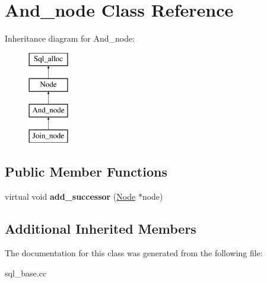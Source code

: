 \hypertarget{classAnd__node}{}\section{And\+\_\+node Class Reference}
\label{classAnd__node}
Inheritance diagram for And\+\_\+node\+:\begin{figure}[H]
\begin{center}
\leavevmode
\includegraphics[height=4.000000cm]{classAnd__node}
\end{center}
\end{figure}
\subsection*{Public Member Functions}
\begin{DoxyCompactItemize}
\item 
\mbox{\label{classAnd__node_ad5e9b18061d8e23a3931a6c2a4db316c}} 
virtual void {\bfseries add\+\_\+successor} (\mbox{\hyperlink{classNode}{Node}} $\ast$node)
\end{DoxyCompactItemize}
\subsection*{Additional Inherited Members}


The documentation for this class was generated from the following file\+:\begin{DoxyCompactItemize}
\item 
sql\+\_\+base.\+cc\end{DoxyCompactItemize}
